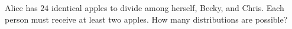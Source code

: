 Alice has $24$ identical apples to divide among herself, Becky, and Chris. Each person must receive at least two apples. How many distributions are possible?
